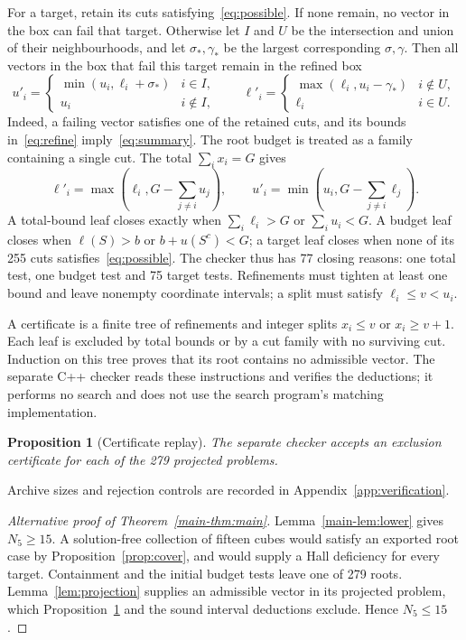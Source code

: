 \documentclass[11pt]{article}
\newtheorem{proposition}[theorem]{Proposition}
\theoremstyle{remark}
\begin{document}
For a target, retain its cuts satisfying~\eqref{eq:possible}. If none remain,
no vector in the box can fail that target. Otherwise let $I$ and $U$ be the
intersection and union of their neighbourhoods, and let $\sigma_*,\gamma_*$ be the
largest corresponding $\sigma,\gamma$. Then all vectors in the box that fail this
target remain in the refined box
\begin{equation}\label{eq:summary}
 u'_i=\begin{cases}\min(u_i,\ell_i+\sigma_*)&i\in I,\\u_i&i\notin I,\end{cases}
 \qquad
 \ell'_i=\begin{cases}\max(\ell_i,u_i-\gamma_*)&i\notin U,\\\ell_i&i\in U.\end{cases}
\end{equation}
Indeed, a failing vector satisfies one of the retained cuts, and its bounds
in~\eqref{eq:refine} imply~\eqref{eq:summary}. The root budget is treated as
a family containing a single cut. The total $\sum_i x_i=G$ gives
\[
 \ell'_i=\max\!\left(\ell_i,G-\sum_{j\ne i}u_j\right),\qquad
 u'_i=\min\!\left(u_i,G-\sum_{j\ne i}\ell_j\right).
\]
A total-bound leaf closes exactly when $\sum_i\ell_i>G$ or
$\sum_i u_i<G$. A budget leaf closes when
$\ell(S)>b$ or $b+u(S^c)<G$; a target leaf closes when none of its
255 cuts satisfies~\eqref{eq:possible}. The checker thus has 77 closing
reasons: one total test, one budget test and 75 target tests. Refinements
must tighten at least one bound and leave
nonempty coordinate intervals; a split must satisfy $\ell_i\le v<u_i$.

A certificate is a finite tree of refinements and integer splits
$x_i\le v$ or $x_i\ge v+1$. Each leaf is excluded by total bounds or by a
cut family with no surviving cut. Induction on this tree proves that its
root contains no admissible vector. The separate C++ checker reads these
instructions and verifies the deductions; it performs no search and does
not use the search program's matching implementation.

\begin{proposition}[Certificate replay]\label{prop:replay}
The separate checker accepts an exclusion certificate for each of the
279 projected problems.
\end{proposition}
Archive sizes and rejection controls are recorded in
Appendix~\ref{app:verification}.

\begin{proof}[Alternative proof of Theorem~\ref{main-thm:main}]
Lemma~\ref{main-lem:lower} gives $N_5\ge15$. A solution-free collection of fifteen
cubes would satisfy an exported root case by Proposition~\ref{prop:cover},
and would supply a Hall deficiency for every target. Containment and the initial
budget tests leave one of 279 roots. Lemma~\ref{lem:projection} supplies an
admissible vector in its projected problem, which Proposition~\ref{prop:replay}
and the sound interval deductions exclude. Hence $N_5\le15$.
\end{proof}
\end{document}
